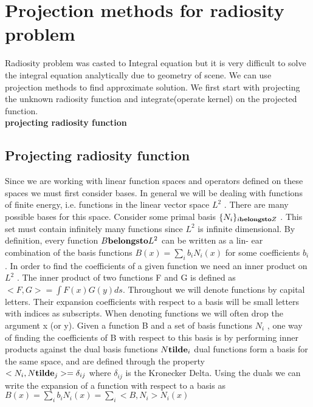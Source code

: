 

\chapter{Projection methods for radiosity problem}
Radiosity problem was casted to Integral equation but it is very difficult to solve the integral equation analytically due to geometry of scene. We can use projection methods to find approximate solution. We first start with projecting the unknown radiosity function and integrate(operate kernel) on the projected function.\\

{\bf projecting radiosity function}
\section{Projecting radiosity function}
Since we are working with linear function spaces and operators
defined on these spaces we must first consider bases. In general
we will be dealing with functions of finite energy, i.e. functions
in the linear vector space $L^2$ . There are many possible bases for
this space. Consider some primal basis $\{N_i \}_{i{\bf belongs to}Z}$ . This set must contain infinitely many functions since $L^2$ is infinite dimensional.
By definition, every function $B{\bf belongs to}L^2$ can be written as a lin-
ear combination of the basis functions $B(x) = \sum _i b_i N_i(x)$ for
some coefficients $b_i$ . In order to find the coefficients of a given
function we need an inner product on $L^2$ . The inner product of
two functions F and G is defined as $<F, G> = \int F(x) G(y) ds$.
Throughout we will denote functions by capital letters. Their expansion coefficients with respect to a basis will be small letters
with indices as subscripts. When denoting functions we will often
drop the argument x (or y).
Given a function B and a set of basis functions $N_i$ , one way
of finding the coefficients of B with respect to this basis is by
performing inner products against the dual basis functions $N{\bf tilde}_i$
dual functions form a basis for the same space, and are defined
through the property\\
$<N_i,N{\bf tilde}_j>=\delta_{ij}$
where $\delta_{ij}$ is the Kronecker Delta. Using the duals we can write
the expansion of a function with respect to a basis as\\

$B(x) = \sum_ib_iN_i(x)= \sum_i<B,N_i>N_i(x)$\\

